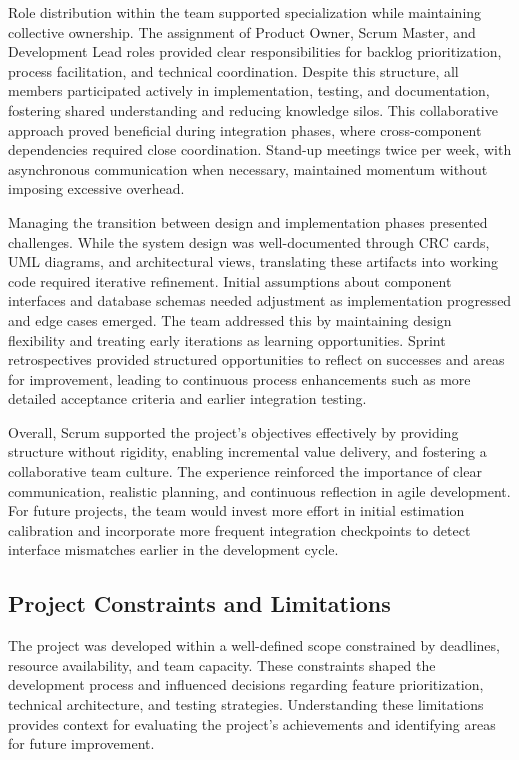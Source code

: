 \documentclass[12pt,a4paper]{article}
\begin{document}
Role distribution within the team supported specialization while maintaining collective ownership. The assignment of Product Owner, Scrum Master, and Development Lead roles provided clear responsibilities for backlog prioritization, process facilitation, and technical coordination. Despite this structure, all members participated actively in implementation, testing, and documentation, fostering shared understanding and reducing knowledge silos. This collaborative approach proved beneficial during integration phases, where cross-component dependencies required close coordination. Stand-up meetings twice per week, with asynchronous communication when necessary, maintained momentum without imposing excessive overhead.\newline

Managing the transition between design and implementation phases presented challenges. While the system design was well-documented through CRC cards, UML diagrams, and architectural views, translating these artifacts into working code required iterative refinement. Initial assumptions about component interfaces and database schemas needed adjustment as implementation progressed and edge cases emerged. The team addressed this by maintaining design flexibility and treating early iterations as learning opportunities. Sprint retrospectives provided structured opportunities to reflect on successes and areas for improvement, leading to continuous process enhancements such as more detailed acceptance criteria and earlier integration testing.\newline

Overall, Scrum supported the project's objectives effectively by providing structure without rigidity, enabling incremental value delivery, and fostering a collaborative team culture. The experience reinforced the importance of clear communication, realistic planning, and continuous reflection in agile development. For future projects, the team would invest more effort in initial estimation calibration and incorporate more frequent integration checkpoints to detect interface mismatches earlier in the development cycle.

\subsection{Project Constraints and Limitations}
The project was developed within a well-defined scope constrained by deadlines, resource availability, and team capacity. These constraints shaped the development process and influenced decisions regarding feature prioritization, technical architecture, and testing strategies. Understanding these limitations provides context for evaluating the project's achievements and identifying areas for future improvement.\newline
\end{document}
